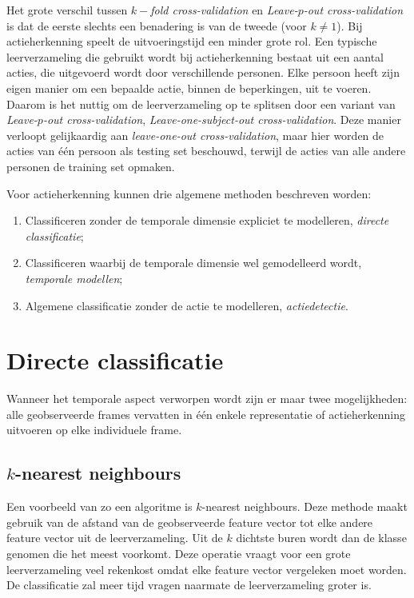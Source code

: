 Het grote verschil tussen \textit{$k-$fold cross-validation} en \textit{Leave-$p$-out cross-validation}  is dat de eerste slechts een benadering is van de tweede (voor $k \neq 1$). Bij actieherkenning speelt de uitvoeringstijd een minder grote rol. Een typische leerverzameling die gebruikt wordt bij actieherkenning bestaat uit een aantal acties, die uitgevoerd wordt door verschillende personen. Elke persoon heeft zijn eigen manier om een bepaalde actie, binnen de beperkingen, uit te voeren. Daarom is het nuttig om de leerverzameling op te splitsen door een variant van \textit{Leave-$p$-out cross-validation}, \textit{Leave-one-subject-out cross-validation}. Deze manier verloopt gelijkaardig aan \textit{leave-one-out cross-validation}, maar hier worden de acties van één persoon als testing set beschouwd, terwijl de acties van alle andere personen de training set opmaken.



Voor actieherkenning kunnen drie algemene methoden beschreven worden:
\begin{enumerate}
	\item Classificeren zonder de temporale dimensie expliciet te modelleren, \textit{directe classificatie};
	\item Classificeren waarbij de temporale dimensie wel gemodelleerd wordt, \textit{temporale modellen};
	\item Algemene classificatie zonder de actie te modelleren, \textit{actiedetectie}.
\end{enumerate}


\section{Directe classificatie}
Wanneer het temporale aspect verworpen wordt zijn er maar twee mogelijkheden: alle geobserveerde frames vervatten in één enkele representatie of actieherkenning uitvoeren op elke individuele frame. 

\subsection{$k$-nearest neighbours}

Een voorbeeld van zo een algoritme is $k$-nearest neighbours. Deze methode maakt gebruik van de afstand van de geobserveerde feature vector tot elke andere feature vector uit de leerverzameling. Uit de $k$ dichtste buren wordt dan de klasse genomen die het meest voorkomt. Deze operatie vraagt voor een grote leerverzameling veel rekenkost omdat elke feature vector vergeleken moet worden. De classificatie zal meer tijd vragen naarmate de leerverzameling groter is. 

